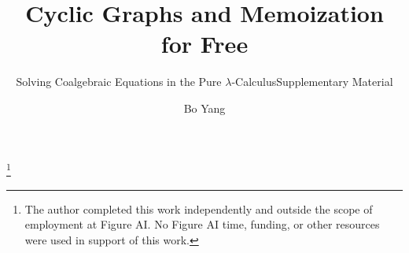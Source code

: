 \newcommand{\Sh}{\mathsf{Sh}}
\newcommand{\Lamsh}{\mathsf{Lam}}
\newcommand{\Appsh}{\mathsf{App}}
\newcommand{\Varsh}{\mathsf{Var}}
\newcommand{\dlam}{\mathord{\downarrow}\lambda}
\newcommand{\dhead}{\mathord{\downarrow}\mathsf{h}}
\newcommand{\darg}{\mathord{\downarrow}\mathsf{a}}
\newcommand{\subt}[2]{#1\!\downarrow\!#2}
\newcommand{\reduces}{\twoheadrightarrow}
\newcommand{\bred}{\rightarrow_{\beta}}
\newcommand{\present}{\mathtt{present}}


\makeatletter
{}
\makeatother



\title{Cyclic Graphs and Memoization for Free}
\ifColambdaBody
  \subtitle{Solving Coalgebraic Equations in the Pure $\lambda$-Calculus}
\else
  \subtitle{Supplementary Material}
\fi

\author{Bo Yang}
\thanks{The author completed this work independently and outside the scope of employment at Figure AI. No Figure AI time, funding, or other resources were used in support of this work.}

